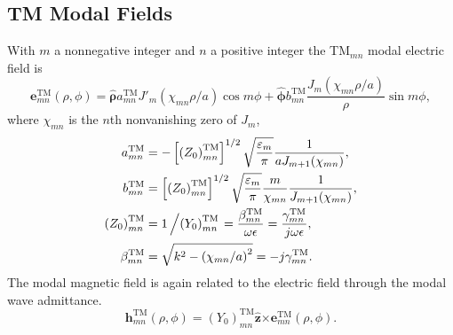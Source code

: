 \documentclass[11pt]{article}
\newcommand{\z}{\boldsymbol{\hat{z}}}
\newcommand{\cross}{\boldsymbol{\times}}
\newcommand{\e}{\boldsymbol{e}}
\newcommand{\h}{\boldsymbol{h}}
\newcommand{\phihat}{\boldsymbol{\hat{\phi}}}
\newcommand{\rhohat}{\boldsymbol{\hat{\rho}}}
\newcommand{\TM}{\text{TM}}
\begin{document}
\subsection{TM Modal Fields}
With $m$ a nonnegative integer and $n$ a positive integer 
the TM$_{mn}$ modal electric field is
\begin{equation}
  \e^{\TM}_{mn}(\rho,\phi) = \rhohat a^{\TM}_{mn} 
            J'_m(\chi_{mn}\rho/a)  \cos m\phi +
            \phihat b^{\TM}_{mn} \frac{J_m(\chi_{mn}\rho/a)}{\rho} \sin m\phi,
\end{equation}
where
$\chi_{mn}$ is the $n$th nonvanishing zero of $J_m$,
\begin{align}
  a^{\TM}_{mn} &= -\left[ \left( Z_0 \right) ^{\TM} _{mn} \right]^{1/2}
             \sqrt{\frac{\varepsilon_m}{\pi}}
             \frac{1}{aJ_{m+1}(\chi_{mn})}, \\
  b^{\TM}_{mn} &= \left[ \left( Z_0 \right) ^{\TM} _{mn} \right]^{1/2}
             \sqrt{\frac{\varepsilon_m}{\pi}}
             \frac{m}{\chi_{mn}}  \frac{1}{J_{m+1}(\chi_{mn})}, \label{eq:TMlast} \\
  \left( Z_0 \right) ^{\TM} _{mn} &= 1\left/ \left(Y_0\right)^{\TM}_{mn}
      \right.  
      = 
     \frac{\beta^{\TM}_{mn}}{\omega\epsilon} =
      \frac{\gamma^{\TM}_{mn}}{j\omega\epsilon}, \\
  \beta^{\TM}_{mn} &= \sqrt{k^2 - \left( \chi_{mn}/a\right)^2}
    = -j\gamma^{\TM}_{mn}.  \label{eq:betamntm}
\end{align}
The modal magnetic field is again related to the electric field through
the modal wave admittance.
\begin{equation}
  \h^{\TM}_{mn}(\rho,\phi) = \left(Y_0\right)^{\TM}_{mn} \z \cross 
      \e^{\TM}_{mn}(\rho,\phi).
\end{equation}





\end{document}

